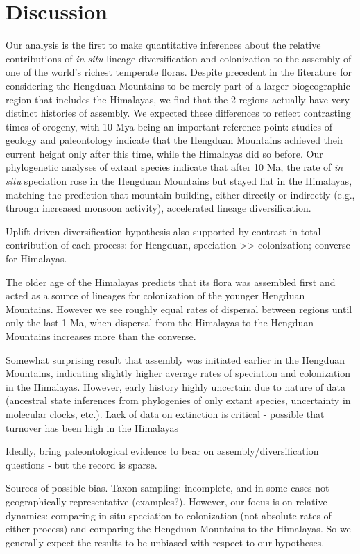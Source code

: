 \section{Discussion}

Our analysis is the first to make quantitative inferences about the relative contributions of \textit{in situ} lineage diversification and colonization to the assembly of one of the world's richest temperate floras. Despite precedent in the literature for considering the Hengduan Mountains to be merely part of a larger biogeographic region that includes the Himalayas, we find that the 2 regions actually have very distinct histories of assembly. We expected these differences to reflect contrasting times of orogeny, with 10 Mya being an important reference point: studies of geology and paleontology indicate that the Hengduan Mountains achieved their current height only after this time, while the Himalayas did so before. Our phylogenetic analyses of extant species indicate that after 10 Ma, the rate of \textit{in situ} speciation rose in the Hengduan Mountains but stayed flat in the Himalayas, matching the prediction that mountain-building, either directly or indirectly (e.g., through increased monsoon activity), accelerated lineage diversification.

Uplift-driven diversification hypothesis also supported by contrast in total contribution of each process: for Hengduan, speciation >> colonization; converse for Himalayas.

The older age of the Himalayas predicts that its flora was assembled first and acted as a source of lineages for colonization of the younger Hengduan Mountains. However we see roughly equal rates of dispersal between regions until only the last 1 Ma, when dispersal from the Himalayas to the Hengduan Mountains increases more than the converse. 

Somewhat surprising result that assembly was initiated earlier in the Hengduan Mountains, indicating slightly higher average rates of speciation and colonization in the Himalayas. However, early history highly uncertain due to nature of data (ancestral state inferences from phylogenies of only extant species, uncertainty in molecular clocks, etc.). Lack of data on extinction is critical - possible that turnover has been high in the Himalayas

Ideally, bring paleontological evidence to bear on assembly/diversification questions - but the record is sparse.

Sources of possible bias. Taxon sampling: incomplete, and in some cases not geographically representative (examples?). However, our focus is on relative dynamics: comparing in situ speciation to colonization (not absolute rates of either process) and comparing the Hengduan Mountains to the Himalayas. So we generally expect the results to be unbiased with respect to our hypotheses. 

